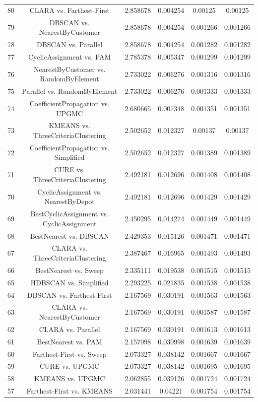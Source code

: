 \documentclass[a4paper,10pt]{article}
\begin{document}
\begin{landscape}
\begin{table}[!htp]
\begin{tabular}{cccccc}
80&CLARA vs. Farthest-First&2.858678&0.004254&0.00125&0.00125\\
79&DBSCAN vs. NearestByCustomer&2.858678&0.004254&0.001266&0.001266\\
78&DBSCAN vs. Parallel&2.858678&0.004254&0.001282&0.001282\\
77&CyclicAssignment vs. PAM&2.785378&0.005347&0.001299&0.001299\\
76&NearestByCustomer vs. RandomByElement&2.733022&0.006276&0.001316&0.001316\\
75&Parallel vs. RandomByElement&2.733022&0.006276&0.001333&0.001333\\
74&CoefficientPropagation vs. UPGMC&2.680665&0.007348&0.001351&0.001351\\
73&KMEANS vs. ThreeCriteriaClustering&2.502652&0.012327&0.00137&0.00137\\
72&CoefficientPropagation vs. Simplified&2.502652&0.012327&0.001389&0.001389\\
71&CURE vs. ThreeCriteriaClustering&2.492181&0.012696&0.001408&0.001408\\
70&CyclicAssignment vs. NearestByDepot&2.492181&0.012696&0.001429&0.001429\\
69&BestCyclicAssignment vs. CyclicAssignment&2.450295&0.014274&0.001449&0.001449\\
68&BestNearest vs. DBSCAN&2.429353&0.015126&0.001471&0.001471\\
67&CLARA vs. ThreeCriteriaClustering&2.387467&0.016965&0.001493&0.001493\\
66&BestNearest vs. Sweep&2.335111&0.019538&0.001515&0.001515\\
65&HDBSCAN vs. Simplified&2.293225&0.021835&0.001538&0.001538\\
64&DBSCAN vs. Farthest-First&2.167569&0.030191&0.001563&0.001563\\
63&CLARA vs. NearestByCustomer&2.167569&0.030191&0.001587&0.001587\\
62&CLARA vs. Parallel&2.167569&0.030191&0.001613&0.001613\\
61&BestNearest vs. PAM&2.157098&0.030998&0.001639&0.001639\\
60&Farthest-First vs. Sweep&2.073327&0.038142&0.001667&0.001667\\
59&CURE vs. UPGMC&2.073327&0.038142&0.001695&0.001695\\
58&KMEANS vs. UPGMC&2.062855&0.039126&0.001724&0.001724\\
57&Farthest-First vs. KMEANS&2.031441&0.04221&0.001754&0.001754\\

\end{tabular}
\end{table}
\end{landscape}
\end{document}
